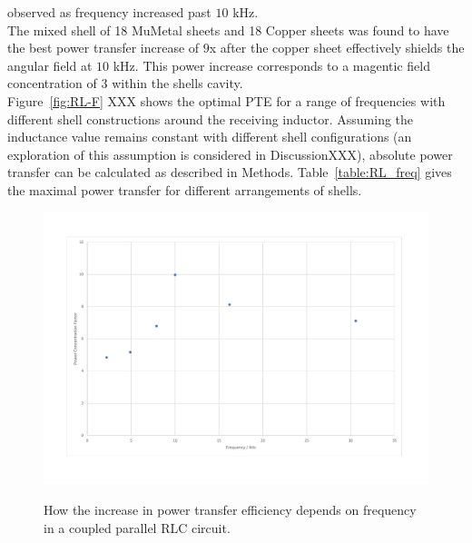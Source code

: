 \documentclass[11pt]{iopart}
\begin{document}
observed as frequency increased past $10$ kHz.\\ The mixed shell of 18
MuMetal sheets and 18 Copper sheets was found to have the best power
transfer increase of $9$x after the copper sheet effectively shields
the angular field at $10$ kHz. This power increase corresponds to a
magentic field concentration of $3$ within the shells
cavity.\\ Figure~\ref{fig:RL-F} XXX shows the optimal PTE for a range
of frequencies with different shell constructions around the receiving
inductor.  Assuming the inductance value remains constant with
different shell configurations (an exploration of this assumption is
considered in DiscussionXXX), absolute power transfer can be
calculated as described in Methods.  Table~\ref{table:RL_freq} gives
the maximal power transfer for different arrangements of shells.\\

\begin{figure}
  \begin{center}
   \noindent\includegraphics[width=0.75\linewidth]{images/RLC-P.pdf}
  \label{fig:RLC-P}
  \end{center}
  \caption{How the increase in power transfer efficiency depends on
    frequency in a coupled parallel RLC circuit.}
\end{figure}
\end{document}
